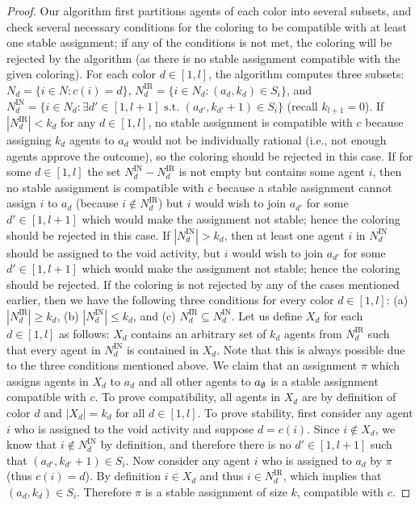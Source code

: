 \begin{proof}
Our algorithm first partitions agents of each color into several subsets, and check several necessary conditions for the coloring to be compatible with at least one stable assignment; if any of the conditions is not met, the coloring will be rejected by the algorithm (as there is no stable assignment compatible with the given coloring). 
For each color $d\in [1, l]$, the algorithm computes three subsets: $N_d = \{i \in N : c(i) = d\}$,
 $N^{\text{IR}}_d = \{i \in N_d : (a_d, k_d) \in S_i \}$, and
 $N^{\text{IN}}_d = \{i \in N_d : \exists d'\in[1, l+1] \text{~s.t.~} (a_{d'}, k_{d'}+1) \in S_i\}$ (recall $k_{l+1} = 0$).
If $|N^{\text{IR}}_d| < k_d$ for any $d\in [1, l]$, no stable assignment is compatible with $c$ because assigning $k_d$ agents to $a_d$ would not be individually rational (i.e., not enough agents approve the outcome), so the coloring should be rejected in this case.
If for some $d \in [1, l]$ the set $N^{\text{IN}}_d - N^{\text{IR}}_d$ is not empty but contains some agent $i$, then no stable assignment is compatible with $c$ because a stable assignment cannot assign $i$ to $a_d$ (because $i\not\in N^{\text{IR}}_d$) but $i$ would wish to join $a_{d'}$ for some $d'\in [1, l+1]$ which would make the assignment not stable; hence the coloring should be rejected in this case. 
If $|N^{\text{IN}}_d| > k_d$, then at least one agent $i$ in $N^{\text{IN}}_d$ should be assigned to the void activity, but $i$ would wish to join $a_{d'}$ for some $d'\in[1, l+1]$ which would make the assignment not stable; hence the coloring should be rejected.
If the coloring is not rejected by any of the cases mentioned earlier, then we have the following three conditions for every color $d\in [1, l]$: (a) $|N^{\text{IR}}_d| \geq k_d$, (b) $|N^{\text{IN}}_d| \leq k_d$, and (c) $N^{\text{IR}}_d \subseteq N^{\text{IN}}_d$.
Let us define $X_d$ for each $d\in [1, l]$ as follows: $X_d$ contains an arbitrary set of $k_d$ agents from $N^{\text{IR}}_d$ such that every agent in $N^{\text{IN}}_d$ is contained in $X_d$. Note that this is always possible due to the three conditions mentioned above. 
We claim that an assignment $\pi$ which assigns agents in $X_d$ to $a_d$ and all other agents to $a_{\emptyset}$ is a stable assignment compatible with $c$. To prove compatibility, all agents in $X_d$ are by definition of color $d$ and $|X_d| = k_d$ for all $d\in [1, l]$.
To prove stability, first consider any agent $i$ who is assigned to the void activity and suppose $d = c(i)$. Since $i\not\in X_d$, we know that $i\not\in N^{\text{IN}}_d$ by definition, and therefore there is no $d'\in[1,l+1]$ such that $(a_{d'}, k_{d'}+1)\in S_i$. Now consider any agent $i$ who is assigned to $a_d$ by $\pi$ (thus $c(i) = d$). By definition $i\in X_d$ and thus $i\in N^{\text{IR}}_d$, which implies that $(a_d, k_d)\in S_i$. Therefore $\pi$ is a stable assignment of size $k$, compatible with $c$. 


\end{proof}
